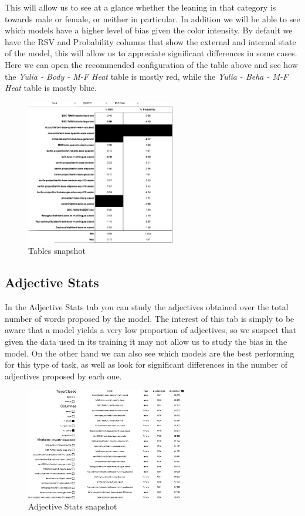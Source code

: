 \documentclass[
twocolumn,
]{ceurart}
\begin{document}
This will allow us to see at a glance whether the leaning in that category is towards male or female, or neither in particular. In addition we will be able to see which models have a higher level of bias given the color intensity. By default we have the RSV and Probability columns that show the external and internal state of the model, this will allow us to appreciate significant differences in some cases.
Here we can open the recommended configuration of the table above and see how the \emph{Yulia - Body - M-F Heat} table is mostly red, while the \emph{Yulia - Beha - M-F Heat} table is mostly blue.

\begin{figure}[htp]
    \centering
    \includegraphics[width=6.5cm]{pics/f2}
    \caption{Tables snapshot}
    \label{fig:tables}
\end{figure}

\subsection{Adjective Stats}
In the Adjective Stats tab you can study the adjectives obtained over the total number of words proposed by the model. The interest of this tab is simply to be aware that a model yields a very low proportion of adjectives, so we suspect that given the data used in its training it may not allow us to study the bias in the model. On the other hand we can also see which models are the best performing for this type of task, as well as look for significant differences in the number of adjectives proposed by each one.

\begin{figure}[htp]
    \centering
    \includegraphics[width=7cm]{pics/f3}
    \caption{Adjective Stats snapshot}
    \label{fig:adjstats}
\end{figure}
\end{document}
